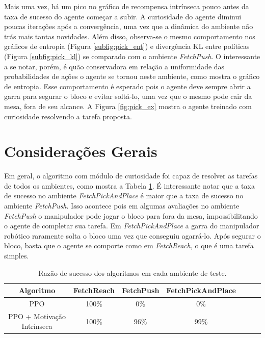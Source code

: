 Mais uma vez, há um pico no gráfico de recompensa intrínseca pouco antes da taxa de sucesso do agente começar a subir. A curiosidade do agente diminui poucas iterações após a convergência, uma vez que a dinâmica do ambiente não trás mais tantas novidades. Além disso, observa-se o mesmo comportamento nos gráficos de entropia (Figura \ref{subfig:pick_ent}) e divergência KL entre políticas (Figura \ref{subfig:pick_kl}) se comparado com o ambiente \textit{FetchPush}. O interessante a se notar, porém, é quão conservadora em relação a uniformidade das probabilidades de ações o agente se tornou neste ambiente, como mostra o gráfico de entropia. Esse comportamento é esperado pois o agente deve sempre abrir a garra para segurar o bloco e evitar soltá-lo, uma vez que o mesmo pode cair da mesa, fora de seu alcance. A Figura \ref{fig:pick_ex} mostra o agente treinado com curiosidade resolvendo a tarefa proposta.


\section{Considerações Gerais}
\label{sec:resgerais}

Em geral, o algoritmo com módulo de curiosidade foi capaz de resolver as tarefas de todos os ambientes, como mostra a Tabela \ref{tab:taxasuc}. É interessante notar que a taxa de sucesso no ambiente \textit{FetchPickAndPlace} é maior que a taxa de sucesso no ambiente \textit{FetchPush}. Isso acontece pois em algumas avaliações no ambiente \textit{FetchPush} o manipulador pode jogar o bloco para fora da mesa, impossibilitando o agente de completar sua tarefa. Em \textit{FetchPickAndPlace} a garra do manipulador robótico raramente solta o bloco uma vez que conseguiu agarrá-lo. Após segurar o bloco, basta que o agente se comporte como em \textit{FetchReach}, o que é uma tarefa simples.

\begin{table}[h!]
\centering
\captionsetup{width=1\textwidth}
\caption{Razão de sucesso dos algoritmos em cada ambiente de teste.}
\label{tab:taxasuc} 
\begin{tabular}{|c|c|c|c|c|c|c|}
\hline Algoritmo & FetchReach & FetchPush & FetchPickAndPlace \\ 
\hline PPO & 100\% & 0\% & 0\%\\ 
\hline PPO + Motivação Intrínseca & 100\% & 96\% & 99\%\\ 
\hline 
\end{tabular} 
\end{table}